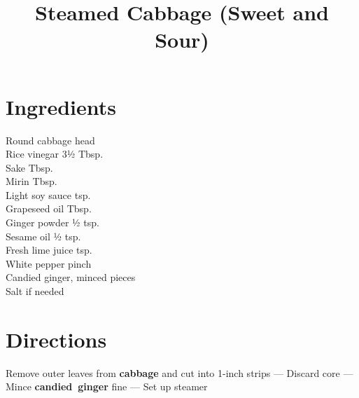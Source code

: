 \documentclass[11pt,letterpaper]{article}
\title{Steamed Cabbage (Sweet and Sour)}
\author{}
\date{}
\begin{document}
\maketitle
\thispagestyle{empty}

\section*{Ingredients}
\setlength{\columnsep}{20pt}
\begin{multicols}{2}
\noindent
    Round cabbage  head \\
    Rice vinegar \dotfill 3½ Tbsp. \\
    Sake  Tbsp. \\
    Mirin  Tbsp. \\
    Light soy sauce  tsp. \\
    \columnbreak
    Grapeseed oil  Tbsp. \\
    Ginger powder \dotfill ½ tsp. \\
    Sesame oil \dotfill ½ tsp. \\
    Fresh lime juice  tsp. \\
    White pepper \dotfill pinch \\
    Candied ginger, minced  pieces \\
    Salt \dotfill if needed \\
\end{multicols}

\section*{Directions}

\noindent
Remove outer leaves from \textbf{cabbage} and cut into 1-inch strips ---
Discard core ---
Mince \textbf{candied~ginger} fine ---
Set up steamer
\end{document}
